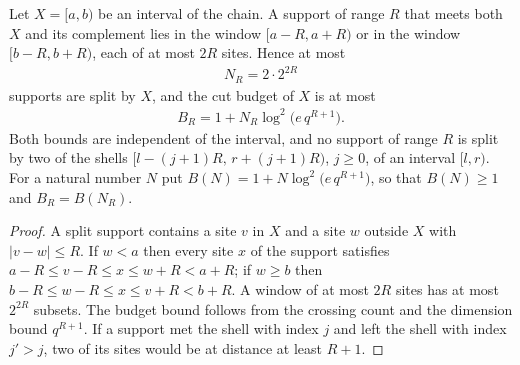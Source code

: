 \begin{lemma}
    \label{lem:chain_crossing_count}
    \leanok
    Let $X=[a,b)$ be an interval of the chain. A support of range $R$ that
    meets both $X$ and its complement lies in the window $[a-R,a+R)$ or in the
    window $[b-R,b+R)$, each of at most $2R$ sites. Hence at most
    \begin{align}
        N_R=2\cdot2^{2R}
    \end{align}
    supports are split by $X$, and the cut budget of $X$ is at most
    \begin{align}
        B_R=1+N_R\log^2\bigl(e\,q^{R+1}\bigr).
    \end{align}
    Both bounds are independent of the interval, and no support of range $R$
    is split by two of the shells $[l-(j+1)R,\,r+(j+1)R)$, $j\ge0$, of an
    interval $[l,r)$. For a natural number $N$ put
    $B(N)=1+N\log^2\bigl(e\,q^{R+1}\bigr)$, so that $B(N)\ge1$ and
    $B_R=B(N_R)$.
    
\end{lemma}
\begin{proof}
    \leanok
    A split support contains a site $v$ in $X$ and a site $w$ outside $X$
    with $|v-w|\le R$. If $w<a$ then every site $x$ of the support satisfies
    $a-R\le v-R\le x\le w+R<a+R$; if $w\ge b$ then $b-R\le w-R\le x\le v+R<b+R$.
    A window of at most $2R$ sites has at most $2^{2R}$ subsets. The budget
    bound follows from the crossing count and the dimension bound $q^{R+1}$. If
    a support met the shell with index $j$ and left the shell with index
    $j'>j$, two of its sites would be at distance at least $R+1$.
\end{proof}

